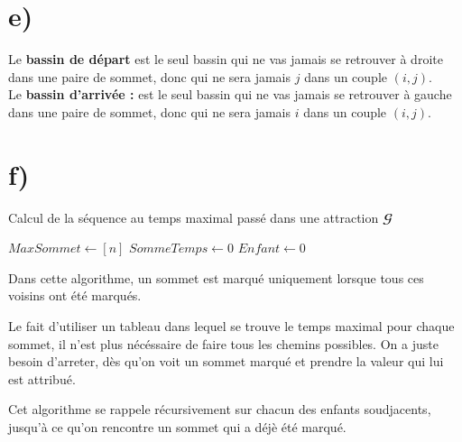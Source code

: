 \documentclass[11pt,a4paper, oneside, oldfontcommands]{memoir}
\newcommand{\G}{$\mathbfcal{G}$}
\begin{document}
\section{e)}
  Le \textbf{bassin de départ} est le seul bassin qui ne vas jamais se retrouver à droite dans une paire de sommet, donc qui ne sera jamais $j$ dans un couple $(i,j)$.\\[1em]
  Le \textbf{bassin d'arrivée :} est le seul bassin qui ne vas jamais se retrouver à gauche dans une paire de sommet, donc qui ne sera jamais $i$ dans un couple $(i,j)$.

\newpage
\section{f)}
  \IncMargin{1em}
  \begin{algorithm}[H]

    \caption{Calcul de la séquence au temps maximal passé dans une attraction \G{}}
    \DontPrintSemicolon
    \LinesNumbered
    \SetAlgoLined

    $MaxSommet \leftarrow [n]$\;
    $SommeTemps \leftarrow 0$\;
    $Enfant \leftarrow 0$\;

    \;
  \end{algorithm}
  \DecMargin{1em}

  \BlankLine

  
Dans cette algorithme, un sommet est marqué uniquement lorsque tous ces voisins ont été marqués.

Le fait d'utiliser un tableau dans lequel se trouve le temps maximal pour chaque sommet,
il n'est plus nécéssaire de faire tous les chemins possibles. On a juste besoin d'arreter,
dès qu'on voit un sommet marqué et prendre la valeur qui lui est attribué.

Cet algorithme se rappele récursivement sur chacun des enfants soudjacents, jusqu'à ce qu'on 
rencontre un sommet qui a déjè été marqué.
\end{document}

